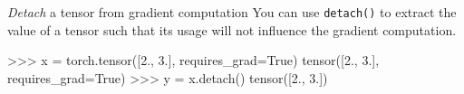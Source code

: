 \begin{frame}[fragile]{\textit{Detach} a tensor from gradient computation}
\vspace{-3mm}
You can use \texttt{detach()} to extract the value of a tensor such that its usage will
not influence the gradient computation.
\begin{python}
>>> x = torch.tensor([2., 3.], requires_grad=True)
tensor([2., 3.], requires_grad=True)
>>> y = x.detach()
tensor([2., 3.])
\end{python}
\end{frame}



